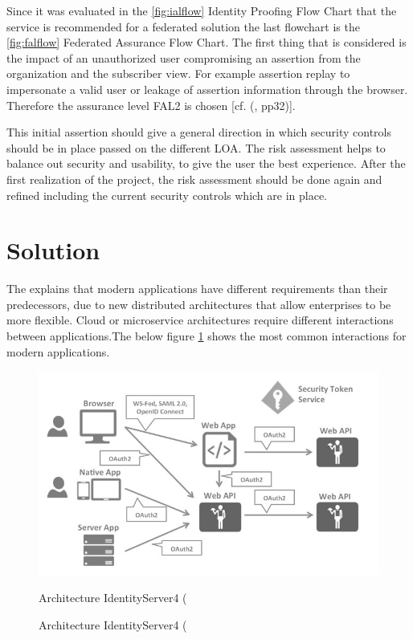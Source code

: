 Since it was evaluated in the \ref{fig:ialflow} Identity Proofing Flow Chart that the service is recommended for a federated solution the last flowchart is the \ref{fig:falflow} Federated Assurance Flow Chart. The first thing that is considered is the impact of an unauthorized user compromising an assertion from the organization and the subscriber view. For example assertion replay to impersonate a valid user or leakage of assertion information through the browser. Therefore the assurance level FAL2 is chosen [cf. (\cite{NIST:2017:DIG}, pp32)]. 


This initial assertion should give a general direction in which security controls should be in place passed on the different LOA. The risk assessment helps to balance out security and usability, to give the user the best experience. After the first realization of the project, the risk assessment should be done again and refined including the current security controls which are in place.
 



\section{Solution}
The \cite{Sakimura:2014:OpenIDConnect} explains that modern applications have different requirements than their predecessors, due to new distributed architectures that allow enterprises to be more flexible. Cloud or microservice architectures require different interactions between applications.The below figure \ref{fig:architecture-identityserver} shows the most common interactions for modern applications.

\begin{figure}[h]
	\centering
	\includegraphics[width=0.9\linewidth]{images/architecture-identityserver}
	\caption[Architecture IdentityServer4]{Architecture IdentityServer4 (\cite{Brock:2018:ID4}}
	\caption{Architecture IdentityServer4 (\cite{Brock:2018:ID4}}
	\label{fig:architecture-identityserver}
\end{figure}



